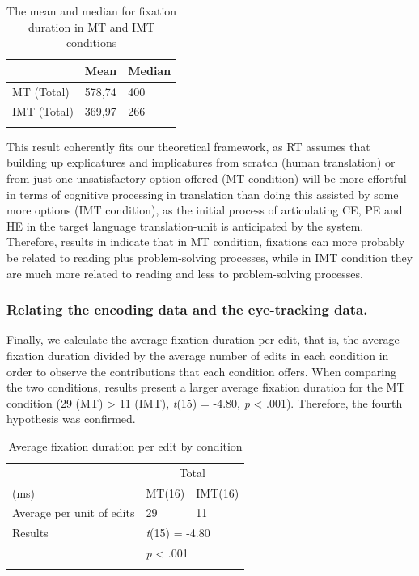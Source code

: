 \documentclass[output=paper]{langsci/langscibook}
\begin{document}
\begin{table}
\begin{tabular}{lll}
\lsptoprule
& Mean & Median\\
\midrule
MT (Total) & 578,74 & 400\\
IMT (Total) & 369,97 & 266\\
\lspbottomrule
\end{tabular}
\caption{The mean and median for fixation duration in MT and IMT conditions}
\label{tab:4}
\end{table}


This result coherently fits our theoretical framework, as RT assumes that building up explicatures and implicatures from scratch (human translation) or from just one unsatisfactory option offered (MT condition) will be more effortful in terms of cognitive processing in translation than doing this assisted by some more options (IMT condition), as the initial process of articulating CE, PE and HE in the target language translation-unit is anticipated by the system. Therefore, results in  indicate that in MT condition, fixations can more probably be related to reading plus problem-solving processes, while in IMT condition they are much more related to reading and less to problem-solving processes.


\subsubsection{Relating the encoding data and the eye-tracking data.}

Finally, we calculate the average fixation duration per edit, that is, the average fixation duration divided by the average number of edits in each condition in order to observe the contributions that each condition offers. When comparing the two conditions, results present a larger average fixation duration for the MT condition                 (29 (MT) {\textgreater} 11 (IMT), \textit{t}(15) = -4.80, \textit{p} {\textless} .001). Therefore, the fourth hypothesis was confirmed.

\begin{table}
\begin{tabular}{lll}
\lsptoprule
 & \multicolumn{2}{c}{Total}\\
(ms) & {  MT(16)} &   IMT(16)\\
\midrule
Average per unit of edits & {29} & 11\\
Results & \multicolumn{2}{l}{\textit{t}(15) = -4.80}\\
& \multicolumn{2}{l}{ \textit{p} {\textless} .001}\\ 
\lspbottomrule
\end{tabular}
\caption{Average fixation duration per edit by condition}
\label{tab:5}
\end{table}
\end{document}

